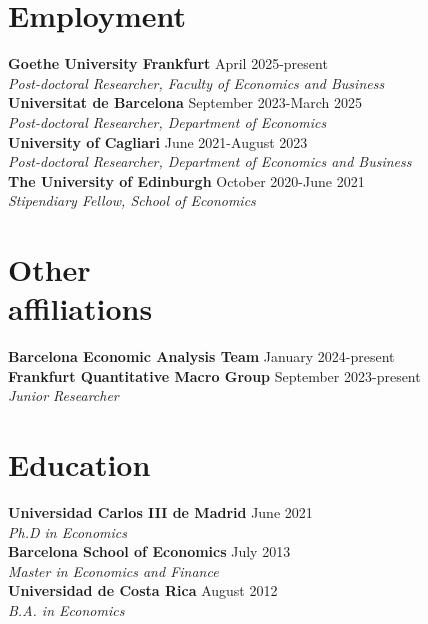 \documentclass[margin]{res} %
\begin{document}
\begin{resume}

 
\section{Employment}
{\bf Goethe University Frankfurt} \hfill April 2025-present  \\
{\sl Post-doctoral Researcher, Faculty of Economics and Business} \\
{\bf Universitat de Barcelona} \hfill September 2023-March 2025  \\
{\sl Post-doctoral Researcher, Department of Economics} \\
{\bf University of Cagliari} \hfill June 2021-August 2023  \\
{\sl Post-doctoral Researcher, Department of Economics and Business} \\
{\bf The University of Edinburgh} \hfill October 2020-June 2021  \\
{\sl Stipendiary Fellow, School of Economics} 


\section{Other \\ affiliations}
{\bf Barcelona Economic Analysis Team} \hfill January 2024-present  \\
{\bf Frankfurt Quantitative Macro Group} \hfill September 2023-present  \\
{\sl Junior Researcher} 


\section{Education}
{\bf Universidad Carlos III de Madrid} \hfill June 2021  \\
{\sl Ph.D in Economics} \\
{\bf Barcelona School of Economics} \hfill July 2013 \\
{\sl Master in Economics and Finance}  \\
{\bf Universidad de Costa Rica} \hfill August 2012 \\
{\sl B.A. in Economics}


\end{resume}
\end{document}
